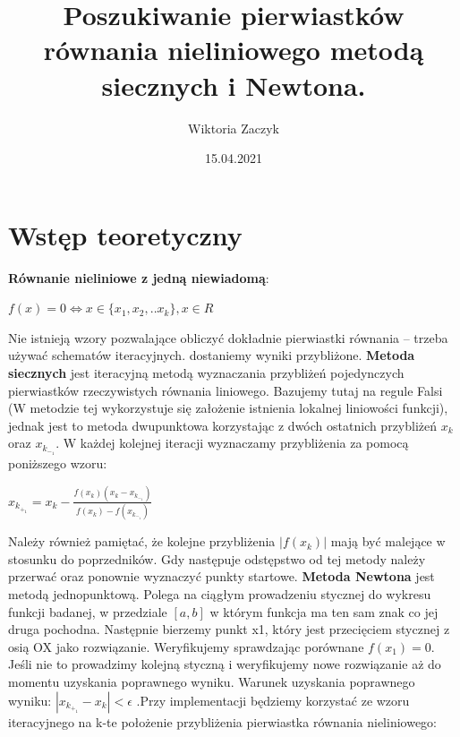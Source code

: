 \documentclass{article}
\title{Poszukiwanie pierwiastków równania nieliniowego metodą siecznych i Newtona.
}
\author{Wiktoria Zaczyk}
\date{15.04.2021}
\begin{document}
\maketitle

\section{Wstęp teoretyczny}

\newline\newline
\textbf{Równanie nieliniowe z jedną niewiadomą}:

\begin{center}
$f(x)=0 \Longleftrightarrow x \in \{x_1,x_2,..x_k\}, x\in R$
\end{center}
Nie istnieją wzory pozwalające obliczyć dokładnie pierwiastki
równania – trzeba używać schematów iteracyjnych. dostaniemy wyniki przybliżone. 
\newline
\newline
\textbf{Metoda siecznych} jest iteracyjną metodą wyznaczania przybliżeń pojedynczych pierwiastków
rzeczywistych równania liniowego. Bazujemy tutaj na regule Falsi (W metodzie tej wykorzystuje się założenie
istnienia lokalnej liniowości funkcji), jednak jest to metoda dwupunktowa korzystając z dwóch ostatnich przybliżeń $x_k$ oraz $x_k_−_1$. W każdej kolejnej iteracji
wyznaczamy przybliżenia za pomocą poniższego wzoru:

\newline
\begin{center}
$x_k_+_1 = x_k-\frac{f(x_k)(x_k-x_k_-_1)}{f(x_k)-f(x_k_-_1)}$
\end{center}
Należy również pamiętać, że kolejne
przybliżenia $|f(x_k)|$ mają być malejące w stosunku do poprzedników. Gdy następuje odstępstwo
od tej metody należy przerwać oraz ponownie wyznaczyć punkty startowe.
\newline\newline
\textbf{Metoda Newtona}
jest metodą jednopunktową. Polega na ciągłym prowadzeniu stycznej do wykresu funkcji badanej, w przedziale $[a,b]$ w którym funkcja ma ten sam znak co jej druga pochodna. Następnie bierzemy punkt x1, który jest przecięciem stycznej z osią OX jako rozwiązanie. Weryfikujemy sprawdzając porównane $f(x_1) = 0$. Jeśli nie to prowadzimy kolejną styczną i weryfikujemy nowe rozwiązanie aż do momentu uzyskania poprawnego wyniku. Warunek uzyskania poprawnego wyniku: $|x_k_+_1-x_k| < \epsilon$ .Przy implementacji będziemy korzystać ze wzoru iteracyjnego na k-te położenie przybliżenia
pierwiastka równania nieliniowego:
\end{document}
